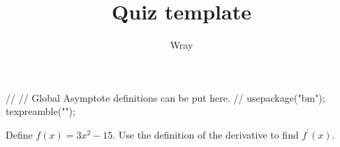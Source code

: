 \documentclass[addpoints, 12pt]{exam}
\title{Quiz template}
\author{Wray}
\begin{document}
\begin{asydef}
//
// Global Asymptote definitions can be put here.
//
usepackage("bm");
texpreamble("\def\V#1{\bm{#1}}");
\end{asydef}



\bigskip

             
\bigskip
\bigskip
\begin{questions}

\question[20]
Define $f(x) = 3x^2 - 15$.  Use the definition of the derivative to find $f^{\prime}(x)$.
\end{questions}
\end{document}
